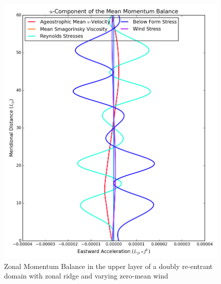 \documentclass[12pt,a4paper]{report}
\begin{document}
 \begin{figure}
 	\centering
 	\begin{minipage}[b]{0.45\linewidth}
 		\centering
 		\includegraphics[width=\linewidth ]{umom_3}
 		\caption{Zonal Momentum Balance in the upper layer of 
 			a doubly re-entrant domain with 
 			zonal ridge and varying zero-mean wind}
 		\label{fig:umomlayer3}
 	\end{minipage}
 	\quad
 	\begin{minipage}[b]{0.45\linewidth}
 		\centering

\end{minipage}
\end{figure}
\end{document}
